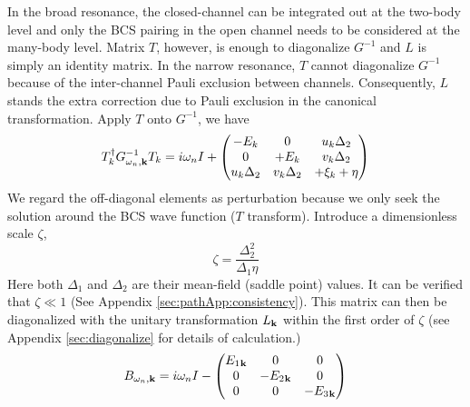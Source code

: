 In the broad resonance, the closed-channel can be integrated out at the two-body level and  only the BCS pairing in the open channel needs to be considered at the many-body level. Matrix $T$, however, is enough to diagonalize $G^{-1}$ and $L$ is simply an identity matrix.  %
In the narrow resonance, $T$ cannot diagonalize $G^{-1}$ because of the inter-channel Pauli exclusion between channels.  Consequently, $L$ stands the extra correction due to Pauli exclusion in the canonical transformation. Apply $T$ onto $G^{-1}$, we have 
\begin{equation}\label{eq:pathInt2:G2}
T_k^{\dagger}G_{\omega_{n},\mathbf{k}}^{-1}T_k=i\omega_nI+\begin{pmatrix}-E_k&0&u_k\Delta_2\\0&+E_k&v_k\Delta_2\\u_k\Delta_2&v_k\Delta_2&+\xi_k+\eta\end{pmatrix}
\end{equation}
We regard the off-diagonal elements as perturbation because  we  only seek the solution around the BCS wave function ($T$ transform). 
Introduce a dimensionless scale $\zeta$,
\begin{equation}\label{eq:pathInt2:zetaDef}
\boxed{\zeta=\frac{\Delta_{2}^{2}}{\Delta_{1}\eta}}
\end{equation}
Here both $\Delta_{1}$ and $\Delta_{2}$ are their mean-field (saddle point) values.  It can be verified that $\zeta\ll1$ (See Appendix \ref{sec:pathApp:consistency}).  
This matrix can then be diagonalized with  the unitary transformation $L_{\mathbf{k}}$ within the first order of $\zeta$  (see Appendix \ref{sec:diagonalize} for details of calculation.)
\begin{equation}\label{eq:pathInt2:Bapprox}
\begin{split}
B_{\omega_{n},\mathbf{k}}&=i\omega_{n}I-
	\begin{pmatrix}E_{1}{}_{\mathbf{k}}&0&0\\0&-E_{2}{}_{\mathbf{k}}&0\\0&0&-E_{3}{}_{\mathbf{k}}\end{pmatrix}\\
\end{split}	
\end{equation}
